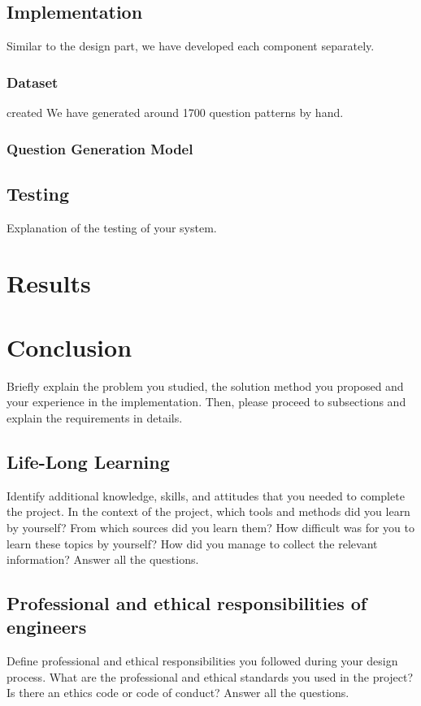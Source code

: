 \documentclass{mefsdp}
\begin{document}
	\subsection{Implementation}
	Similar to the design part, we have developed each component separately.
	\subsubsection{Dataset}
	
	created We have generated around 1700 question patterns by hand.
	\subsubsection{Question Generation Model}
	\subsection{Testing}
	Explanation of the testing of your system.
	
	\section{Results}
	
	
	\section{Conclusion}
	Briefly explain the problem you studied, the solution method you proposed and your experience in the implementation. Then, please proceed to subsections and explain the requirements in details. 
	
	\subsection{Life-Long Learning}
	Identify additional knowledge, skills, and attitudes that you needed to complete the project. In the context of the project, which tools and methods did you learn by yourself?  From which sources did you learn them? How difficult was for you to learn these topics by yourself? How did you manage to collect the relevant information? Answer all the questions.
	
	\subsection{Professional and ethical responsibilities of engineers}
	Define professional and ethical responsibilities you followed during your design process. What are the professional and ethical standards you used in the project? Is there an ethics code or code of conduct? Answer all the questions.
	
\end{document}
